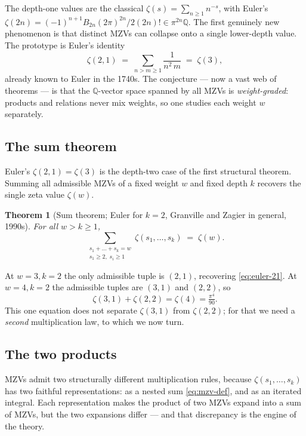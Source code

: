 \documentclass[11pt]{article}
\theoremstyle{plain}
\newtheorem{theorem}{Theorem}
\theoremstyle{remark}
\begin{document}
The depth-one values are the classical $\zeta(s)=\sum_{n\ge1}n^{-s}$, with Euler's $\zeta(2n)=(-1)^{n+1}B_{2n}(2\pi)^{2n}/2(2n)!\in\pi^{2n}\mathbb{Q}$. The first genuinely new phenomenon is that distinct MZVs can collapse onto a single lower-depth value. The prototype is Euler's identity
\begin{equation}
  \zeta(2,1)\;=\;\sum_{n>m\ge1}\frac{1}{n^2\,m}\;=\;\zeta(3),
  \label{eq:euler-21}
\end{equation}
already known to Euler in the 1740s. The conjecture --- now a vast web of theorems --- is that the $\mathbb{Q}$-vector space spanned by all MZVs is \emph{weight-graded}: products and relations never mix weights, so one studies each weight $w$ separately.

\subsection*{The sum theorem}

Euler's $\zeta(2,1)=\zeta(3)$ is the depth-two case of the first structural theorem. Summing all admissible MZVs of a fixed weight $w$ and fixed depth $k$ recovers the single zeta value $\zeta(w)$.
\begin{theorem}[Sum theorem; Euler for $k=2$, Granville and Zagier in general, 1990s]
For all $w>k\ge1$,
\begin{equation}
  \sum_{\substack{s_1+\dots+s_k=w\\ s_1\ge2,\;s_i\ge1}}\zeta(s_1,\dots,s_k)\;=\;\zeta(w).
  \label{eq:sum-thm}
\end{equation}
\end{theorem}
\noindent At $w=3,k=2$ the only admissible tuple is $(2,1)$, recovering \eqref{eq:euler-21}. At $w=4,k=2$ the admissible tuples are $(3,1)$ and $(2,2)$, so
\begin{equation}
  \zeta(3,1)+\zeta(2,2)=\zeta(4)=\tfrac{\pi^4}{90}.
  \label{eq:sum-wt4}
\end{equation}
This one equation does not separate $\zeta(3,1)$ from $\zeta(2,2)$; for that we need a \emph{second} multiplication law, to which we now turn.

\subsection*{The two products}

MZVs admit two structurally different multiplication rules, because $\zeta(s_1,\dots,s_k)$ has two faithful representations: as a nested sum \eqref{eq:mzv-def}, and as an iterated integral. Each representation makes the product of two MZVs expand into a sum of MZVs, but the two expansions differ --- and that discrepancy is the engine of the theory.
\end{document}
